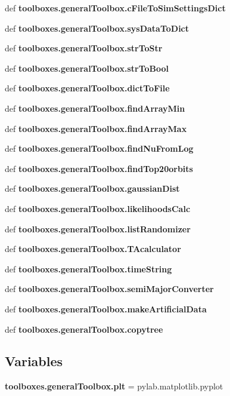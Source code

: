 \begin{DoxyCompactItemize}
def {\bf toolboxes.\-general\-Toolbox.\-c\-File\-To\-Sim\-Settings\-Dict}
\item 
def {\bf toolboxes.\-general\-Toolbox.\-sys\-Data\-To\-Dict}
\item 
def {\bf toolboxes.\-general\-Toolbox.\-str\-To\-Str}
\item 
def {\bf toolboxes.\-general\-Toolbox.\-str\-To\-Bool}
\item 
def {\bf toolboxes.\-general\-Toolbox.\-dict\-To\-File}
\item 
def {\bf toolboxes.\-general\-Toolbox.\-find\-Array\-Min}
\item 
def {\bf toolboxes.\-general\-Toolbox.\-find\-Array\-Max}
\item 
def {\bf toolboxes.\-general\-Toolbox.\-find\-Nu\-From\-Log}
\item 
def {\bf toolboxes.\-general\-Toolbox.\-find\-Top20orbits}
\item 
def {\bf toolboxes.\-general\-Toolbox.\-gaussian\-Dist}
\item 
def {\bf toolboxes.\-general\-Toolbox.\-likelihoods\-Calc}
\item 
def {\bf toolboxes.\-general\-Toolbox.\-list\-Randomizer}
\item 
def {\bf toolboxes.\-general\-Toolbox.\-T\-Acalculator}
\item 
def {\bf toolboxes.\-general\-Toolbox.\-time\-String}
\item 
def {\bf toolboxes.\-general\-Toolbox.\-semi\-Major\-Converter}
\item 
def {\bf toolboxes.\-general\-Toolbox.\-make\-Artificial\-Data}
\item 
def {\bf toolboxes.\-general\-Toolbox.\-copytree}
\end{DoxyCompactItemize}
\subsection*{Variables}
\begin{DoxyCompactItemize}
\item 
{\bf toolboxes.\-general\-Toolbox.\-plt} = pylab.\-matplotlib.\-pyplot
\end{DoxyCompactItemize}
